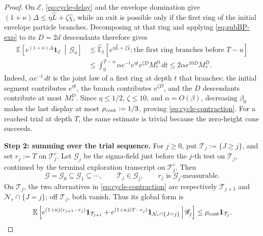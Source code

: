 \documentclass[letterpaper,11pt,reqno]{amsart}
\theoremstyle{definition}
\begin{document}
\begin{proof}
On \(\mathcal E\), \eqref{eq:cycle-delay} and the envelope domination give
\((1+\kappa)\Delta\le\eta\widehat L+\zeta\widehat\chi\), while an exit is
possible only if the first ring of the initial envelope particle branches.
Decomposing at that ring and applying
\eqref{eq:subBP-exp} to its \(D=2d\) descendants therefore gives
\[
\begin{aligned}
\mathbb E\left[
 e^{(1+\kappa)\Delta}\mathbf 1_{\mathcal E}
 \,\middle|\,\mathscr G_u
\right]
&\le
\widehat{\mathbb E}_1\left[
 e^{\eta\widehat L+\zeta\widehat\chi};
 \text{the first ring branches before \(T-u\)}
\right]\\
&\le
\int_0^{T-u}
\alpha e^{-t}
e^{\eta t}
e^{\zeta D}
M_*^D\,dt
\le 2\alpha e^{10D}M_*^D .
\end{aligned}
\]
Indeed, \(\alpha e^{-t}\,dt\) is the joint law of a first ring at depth \(t\)
that branches; the initial segment contributes \(e^{\eta t}\), the branch
contributes \(e^{\zeta D}\), and the \(D\) descendants contribute at most
\(M_*^D\). Since \(\eta\le1/2\), \(\zeta\le10\), and
\(\alpha=O(\beta)\), decreasing \(\beta_0\) makes the last display at most
\(\rho_{\rm cont}:=1/3\), proving \eqref{eq:cycle-contraction}.
For a reached trial at depth \(T\), the same estimate is trivial because the
zero-height cone succeeds.




\smallskip
\noindent\textbf{Step 2: summing over the trial sequence.}
For \(j\ge0\), put \(\mathcal T_j:=\{J\ge j\}\), and set
\(r_j:=T\) on \(\mathcal T_j^c\). Let \(\mathscr G_j\) be the sigma-field
just before the \(j\)-th test on \(\mathcal T_j\), continued by the terminal
exploration transcript on \(\mathcal T_j^c\). Then
\[
        \mathscr G=\mathscr G_0\subseteq\mathscr G_1\subseteq\cdots,
        \qquad
        \mathcal T_j\in\mathscr G_j,
        \qquad
        r_j\text{ is }\mathscr G_j\text{-measurable}.
\]
On \(\mathcal T_j\), the two alternatives in
\eqref{eq:cycle-contraction} are respectively \(\mathcal T_{j+1}\) and
\(\mathcal N_r\cap\{J=j\}\); off \(\mathcal T_j\), both vanish.
Thus its global form is
\[
\mathbb E\left[
 e^{(1+\kappa)(r_{j+1}-r_j)}\mathbf 1_{\mathcal T_{j+1}}
 +e^{(1+\kappa)(T-r_j)}
  \mathbf 1_{\mathcal N_r\cap\{J=j\}}
 \,\middle|\,\mathscr G_j
\right]
\le \rho_{\rm cont}\mathbf 1_{\mathcal T_j}.
\]














\end{proof}
\end{document}
